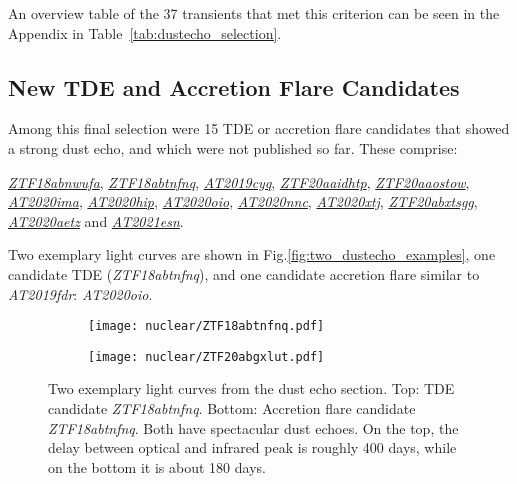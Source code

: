 An overview table of the 37 transients that met this criterion can be seen in the Appendix in Table~\ref{tab:dustecho_selection}.

\subsection{New TDE and Accretion Flare Candidates}
Among this final selection were 15 TDE or accretion flare candidates that showed a strong dust echo, and which were not published so far. These comprise:

\textit{\href{https://ztfnuclear.simeonreusch.com/transient/ZTF18abnwufa}{ZTF18abnwufa}}, \textit{\href{https://ztfnuclear.simeonreusch.com/transient/ZTF18abtnfnq}{ZTF18abtnfnq}}, \textit{\href{https://ztfnuclear.simeonreusch.com/transient/ZTF19aamsgro}{AT2019cyq}}, \textit{\href{https://ztfnuclear.simeonreusch.com/transient/ZTF20aaidhtp}{ZTF20aaidhtp}}, \textit{\href{https://ztfnuclear.simeonreusch.com/transient/ZTF20aaostow}{ZTF20aaostow}}, \textit{\href{https://ztfnuclear.simeonreusch.com/transient/ZTF20aaoxtxi}{AT2020ima}}, \textit{\href{https://ztfnuclear.simeonreusch.com/transient/ZTF20aauvhab}{AT2020hip}}, \textit{\href{https://ztfnuclear.simeonreusch.com/transient/ZTF20abgxlut}{AT2020oio}}, \textit{\href{https://ztfnuclear.simeonreusch.com/transient/ZTF20abhrmri}{AT2020nnc}}, \textit{\href{https://ztfnuclear.simeonreusch.com/transient/ZTF20ablvwmh}{AT2020xtj}}, \textit{\href{https://ztfnuclear.simeonreusch.com/transient/ZTF20abxtsgg}{ZTF20abxtsgg}}, \textit{\href{https://ztfnuclear.simeonreusch.com/transient/ZTF20acyxxfo}{AT2020aetz}} and \textit{\href{https://ztfnuclear.simeonreusch.com/transient/ZTF21aaekxxf}{AT2021esn}}.

Two exemplary light curves are shown in Fig.\ref{fig:two_dustecho_examples}, one candidate TDE (\textit{ZTF18abtnfnq}), and one candidate accretion flare similar to \textit{AT2019fdr}: \textit{AT2020oio}.

\begin{figure}[htbp]
  \centering
  \begin{subfigure}[b]{1\textwidth}
    \centering
    \texttt{[image: nuclear/ZTF18abtnfnq.pdf]}
  \end{subfigure}
  \begin{subfigure}[b]{1\textwidth}
    \centering
    \texttt{[image: nuclear/ZTF20abgxlut.pdf]}
  \end{subfigure}
  \caption[Two exemplary light curves from the dust echo selection]{Two exemplary light curves from the dust echo section. Top: TDE candidate \textit{ZTF18abtnfnq}. Bottom: Accretion flare candidate \textit{ZTF18abtnfnq}. Both have spectacular dust echoes. On the top, the delay between optical and infrared peak is roughly 400 days, while on the bottom it is about 180 days.}
\end{figure}


